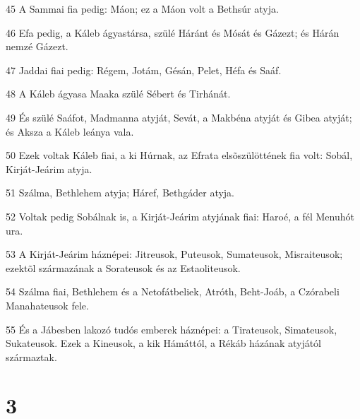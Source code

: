 \par 45 A Sammai fia pedig: Máon; ez a Máon volt a Bethsúr atyja.
\par 46 Efa pedig, a Káleb ágyastársa, szülé Háránt és Mósát és Gázezt; és Hárán nemzé Gázezt.
\par 47 Jaddai fiai pedig: Régem, Jotám, Gésán, Pelet, Héfa és Saáf.
\par 48 A Káleb ágyasa Maaka szülé Sébert és Tirhánát.
\par 49 És szülé Saáfot, Madmanna atyját, Sevát, a Makbéna atyját és Gibea atyját; és Aksza a Káleb leánya vala.
\par 50 Ezek voltak Káleb fiai, a ki Húrnak, az Efrata elsõszülöttének fia volt: Sobál, Kirját-Jeárim atyja.
\par 51 Szálma, Bethlehem atyja; Háref, Bethgáder atyja.
\par 52 Voltak pedig Sobálnak is, a Kirját-Jeárim atyjának fiai: Haroé, a fél Menuhót ura.
\par 53 A Kirját-Jeárim háznépei: Jitreusok, Puteusok, Sumateusok, Misraiteusok; ezektõl származának a Sorateusok és az Estaoliteusok.
\par 54 Szálma fiai, Bethlehem és a Netofátbeliek, Atróth, Beht-Joáb, a Czórabeli Manahateusok fele.
\par 55 És a Jábesben lakozó tudós emberek háznépei: a Tirateusok, Simateusok, Sukateusok. Ezek a Kineusok, a kik Hámáttól, a Rékáb házának atyjától származtak.

\chapter{3}

